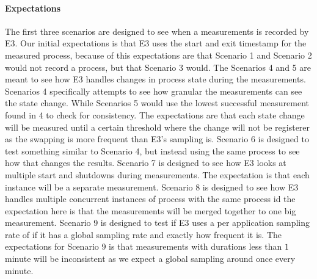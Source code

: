 \paragraph {Expectations}
The first three scenarios are designed to see when a measurements is recorded by E3. Our initial expectations is that E3 uses the start and exit timestamp for the measured process, because of this expectations are that Scenario 1 and Scenario 2 would not record a process, but that Scenario 3 would.
The Scenarios 4 and 5 are meant to see how E3 handles changes in process state during the measurements. Scenarios 4 specifically attempts to see how granular the measurements can see the state change. While Scenarios 5 would use the lowest successful measurement found in 4 to check for consistency. The expectations are that each state change will be measured until a certain threshold where the change will not be registerer as the swapping is more frequent than E3's sampling is. Scenario 6 is designed to test something similar to Scenario 4, but instead using the same process to see how that changes the results.
Scenario 7 is designed to see how E3 looks at multiple start and shutdowns during measurements. The expectation is that each instance will be a separate measurement. Scenario 8 is designed to see how E3 handles multiple concurrent instances of process with the same process id the expectation here is that the measurements will be merged together to one big measurement. Scenario 9 is designed to test if E3 uses a per application sampling rate of if it has a global sampling rate and exactly how frequent it is. The expectations for Scenario 9 is that measurements with durations less than $1$ minute will be inconsistent as we expect a global sampling around once every minute.

